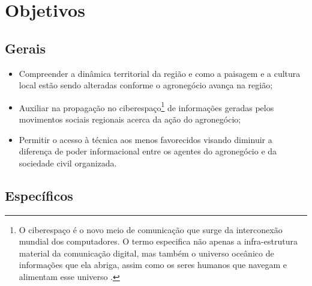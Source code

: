 \section{Objetivos}

\subsection{Gerais}

\begin{itemize}
 \item Compreender a dinâmica territorial da região e como a paisagem e a cultura local estão sendo alteradas conforme o agronegócio avança na região;
 \item Auxiliar na propagação no ciberespaço\footnote{O ciberespaço é o novo meio de comunicação que surge da interconexão mundial dos computadores. O termo especifica não apenas a infra-estrutura material da comunicação digital, mas também o universo oceânico de informações que ela abriga, assim como os seres humanos que navegam e alimentam esse universo \cite[p. 17]{levy}.} de informações geradas pelos movimentos sociais regionais acerca da ação do agronegócio;
 \item Permitir o acesso à técnica aos menos favorecidos visando diminuir a diferença de poder informacional entre os agentes do agronegócio e da sociedade civil organizada.
\end{itemize}

\subsection{Específicos}

